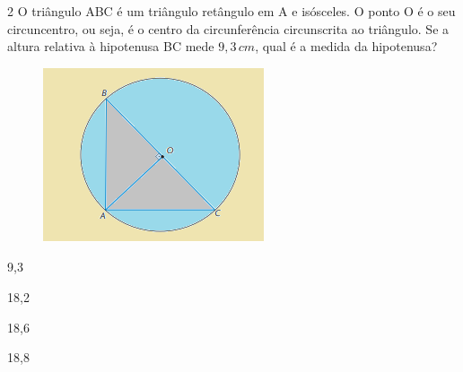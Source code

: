 





\num{2} O triângulo ABC é um triângulo retângulo em A e isósceles. O ponto O
é o seu circuncentro, ou seja, é o centro da circunferência circunscrita
ao triângulo. Se a altura relativa à hipotenusa BC mede $9,3\,cm$, qual é a
medida da hipotenusa?

\begin{figure}[H]
\centering\includegraphics[width=2.5625in,height=2.02083in]{./imgSAEB_8_MAT/media/image35.png}
\end{figure}

\begin{escolha}[itemsep=0pt]
\item 9,3
\item 18,2
\item 18,6 
\item 18,8
\end{escolha}



